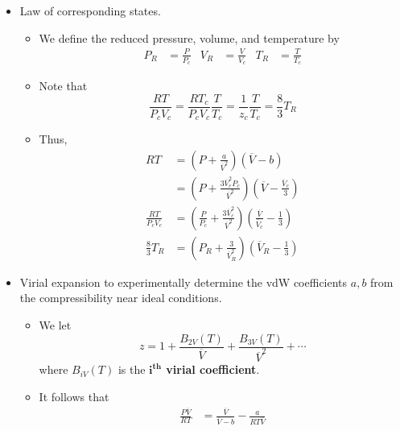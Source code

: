 \documentclass[../notes.tex]{subfiles}
\begin{document}
\begin{itemize}
\begin{itemize}
\begin{itemize}
        \end{itemize}
    \end{itemize}
    \item Law of corresponding states.
    \begin{itemize}
        \item We define the reduced pressure, volume, and temperature by
        \begin{align*}
            P_R &= \frac{P}{P_c}&
            V_R &= \frac{V}{V_c}&
            T_R &= \frac{T}{T_c}
        \end{align*}
        \item Note that
        \begin{equation*}
            \frac{RT}{P_cV_c} = \frac{RT_c}{P_cV_c}\frac{T}{T_c}
            = \frac{1}{z_c}\frac{T}{T_c}
            = \frac{8}{3}T_R
        \end{equation*}
        \item Thus,
        \begin{align*}
            RT &= \left( P+\frac{a}{\overline{V}^2} \right)(\overline{V}-b)\\
            &= \left( P+\frac{3\overline{V}_c^2P_c}{\overline{V}^2} \right)\left( \overline{V}-\frac{\overline{V}_c}{3} \right)\\
            \frac{RT}{P_cV_c} &= \left( \frac{P}{P_c}+\frac{3\overline{V}_c^2}{\overline{V}^2} \right)\left( \frac{\overline{V}}{\overline{V}_c}-\frac{1}{3} \right)\\
            \frac{8}{3}T_R &= \left( P_R+\frac{3}{\overline{V}_R^2} \right)\left( \overline{V}_R-\frac{1}{3} \right)
        \end{align*}
    \end{itemize}
    \item Virial expansion to experimentally determine the vdW coefficients $a,b$ from the compressibility near ideal conditions.
    \begin{itemize}
        \item We let
        \begin{equation*}
            z = 1+\frac{B_{2V}(T)}{\overline{V}}+\frac{B_{3V}(T)}{\overline{V}^2}+\cdots
        \end{equation*}
        where $B_{iV}(T)$ is the \textbf{$\bm{i^\textbf{th}}$ virial coefficient}.
        \item It follows that
        \begin{align*}
            \frac{P\overline{V}}{RT} &= \frac{\overline{V}}{\overline{V}-b}-\frac{a}{RT\overline{V}}\\

\end{align*}
\end{itemize}
\end{itemize}
\end{document}

